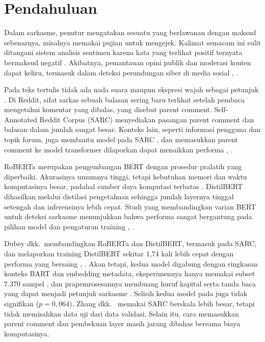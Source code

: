 \documentclass[conference]{IEEEtran}
\begin{document}
\section{Pendahuluan}
Dalam sarkasme, penutur mengatakan sesuatu yang berlawanan dengan maksud sebenarnya, misalnya memakai pujian untuk mengejek. Kalimat semacam ini sulit ditangani sistem analisis sentimen karena kata yang terlihat positif ternyata bermaksud negatif \cite{prakash2025sarcasm}. Akibatnya, pemantauan opini publik dan moderasi konten dapat keliru, termasuk dalam deteksi perundungan siber di media sosial \cite{dhumpati2025sarcasm}, \cite{grover2026emoji}.

Pada teks tertulis tidak ada nada suara maupun ekspresi wajah sebagai petunjuk \cite{jimenez2026bert}. Di Reddit, sifat sarkas sebuah balasan sering baru terlihat setelah pembaca mengetahui komentar yang dibalas, yang disebut parent comment. Self-Annotated Reddit Corpus (SARC) \cite{khodak2018sarc} menyediakan pasangan parent comment dan balasan dalam jumlah sangat besar. Konteks lain, seperti informasi pengguna dan topik forum, juga membantu model pada SARC \cite{hao2023enhanced}, dan memasukkan parent comment ke model transformer dilaporkan dapat menaikkan performa \cite{ataeii2020transformers}, \cite{dubey2025unpacking}.

RoBERTa \cite{liu2019roberta} merupakan pengembangan BERT dengan prosedur pralatih yang diperbaiki. Akurasinya umumnya tinggi, tetapi kebutuhan memori dan waktu komputasinya besar, padahal sumber daya komputasi terbatas \cite{treviso2023efficient}. DistilBERT \cite{sanh2019distilbert} dihasilkan melalui distilasi pengetahuan sehingga jumlah layernya tinggal setengah dan inferensinya lebih cepat. Studi yang membandingkan varian BERT untuk deteksi sarkasme menunjukkan bahwa performa sangat bergantung pada pilihan model dan pengaturan training \cite{jimenez2026bert}, \cite{ullah2026advanced}.

Dubey dkk.\ membandingkan RoBERTa dan DistilBERT, termasuk pada SARC, dan melaporkan training DistilBERT sekitar 1,74 kali lebih cepat dengan performa yang bersaing \cite{dubey2025unpacking}, \cite{dubey2026efficient}. Akan tetapi, kedua model digabung dengan ringkasan konteks BART dan embedding metadata, eksperimennya hanya memakai subset 7.370 sampel \cite{dubey2025unpacking}, dan prapemrosesannya membuang huruf kapital serta tanda baca yang dapat menjadi petunjuk sarkasme \cite{dubey2026efficient}. Selisih kedua model pada \cite{dubey2026efficient} juga tidak signifikan ($p = 0{,}064$). Zhang dkk.\ \cite{zhang2025enhancing} memakai SARC berskala lebih besar, tetapi tidak memisahkan data uji dari data validasi. Selain itu, cara memasukkan parent comment dan pembekuan layer masih jarang dibahas bersama biaya komputasinya.
\end{document}
